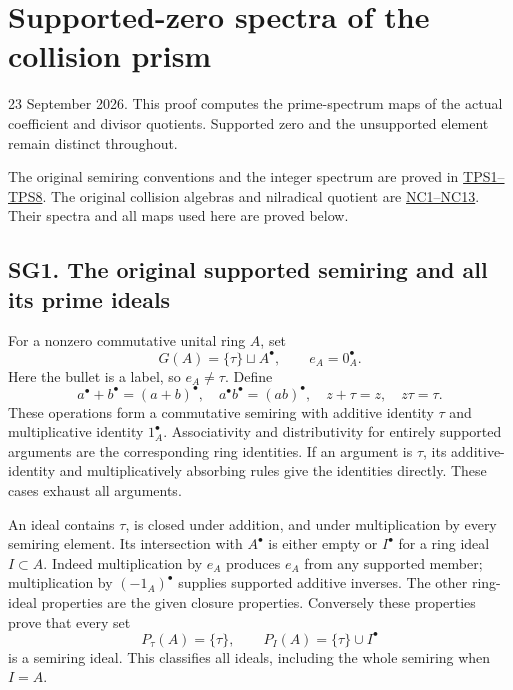\documentclass[
  10pt,
  a4paper,
]{article}
\author{}
\date{}
\begin{document}
{
\setcounter{tocdepth}{3}
\tableofcontents
}
\section{Supported-zero spectra of the collision
prism}\label{supported-zero-spectra-of-the-collision-prism}

23 September 2026. This proof computes the prime-spectrum maps of the
actual coefficient and divisor quotients. Supported zero and the
unsupported element remain distinct throughout.

The original semiring conventions and the integer spectrum are proved in
\href{https://github.com/KokunoYumeto/zeta-function-research-reader/blob/5a89872598df0902b7c1393cf8e4692ca3010a95/workbenches/splitzero-tandem/branches/tau-zero-prime-positivity/supporting_proofs/TAU_PRIME_SPECTRUM_DERIVATION.md}{TPS1--TPS8}.
The original collision algebras and nilradical quotient are
\href{https://github.com/KokunoYumeto/zeta-function-research-reader/blob/5a89872598df0902b7c1393cf8e4692ca3010a95/workbenches/splitzero-tandem/branches/tau-zero-prime-positivity/research_calculations/NILRADICAL_COTANGENT_DIVIDED_RESIDUE_DERIVATION.md}{NC1--NC13}.
Their spectra and all maps used here are proved below.

\subsection{SG1. The original supported semiring and all its prime
ideals}\label{sg1.-the-original-supported-semiring-and-all-its-prime-ideals}

For a nonzero commutative unital ring \(A\), set \[
G(A)=\{\tau\}\sqcup A^\bullet,\qquad e_A=0_A^\bullet.
\tag{SG1}
\] Here the bullet is a label, so \(e_A\ne\tau\). Define \[
a^\bullet+b^\bullet=(a+b)^\bullet,\quad
a^\bullet b^\bullet=(ab)^\bullet,\quad
z+\tau=z,\quad z\tau=\tau.
\tag{SG2}
\] These operations form a commutative semiring with additive identity
\(\tau\) and multiplicative identity \(1_A^\bullet\). Associativity and
distributivity for entirely supported arguments are the corresponding
ring identities. If an argument is \(\tau\), its additive-identity and
multiplicatively absorbing rules give the identities directly. These
cases exhaust all arguments.

An ideal contains \(\tau\), is closed under addition, and under
multiplication by every semiring element. Its intersection with
\(A^\bullet\) is either empty or \(I^\bullet\) for a ring ideal
\(I\subset A\). Indeed multiplication by \(e_A\) produces \(e_A\) from
any supported member; multiplication by \((-1_A)^\bullet\) supplies
supported additive inverses. The other ring-ideal properties are the
given closure properties. Conversely these properties prove that every
set \[
P_\tau(A)=\{\tau\},\qquad
P_I(A)=\{\tau\}\cup I^\bullet
\tag{SG3}
\] is a semiring ideal. This classifies all ideals, including the whole
semiring when \(I=A\).
\end{document}

